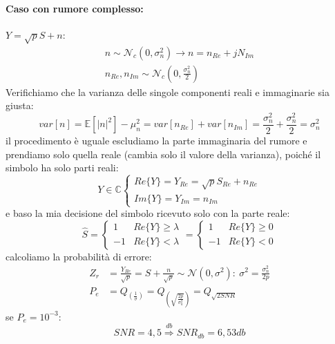             \paragraph{Caso con rumore complesso:} $Y = \sqrt{p}S + n$:
                \begin{gather}
                    n\sim \mathcal{N}_c(0,\sigma_n^2)\rightarrow n = n_{Re} + jN_{Im} \nonumber \\
                    n_{Re},n_{Im}\sim \mathcal{N}_c(0,\frac{\sigma_n^2}{2})\nonumber
                \end{gather}
                Verifichiamo che la varianza delle singole componenti reali e immaginarie sia giusta:
                \[
                    var[n] = \mathbb{E}[|n|^2]-\mu_n^2 = var[n_{Re}]+ var[n_{Im}] = \frac{\sigma_n^2}{2} + \frac{\sigma_n^2}{2} = \sigma_n^2
                \]
                il procedimento  è uguale escludiamo la parte immaginaria del rumore e prendiamo solo quella reale (cambia solo il valore della varianza),
                poiché il simbolo ha solo parti reali:
                \[
                    Y \in \mathbb{C} 
                    \begin{cases}
                        Re\{Y\} = Y_{Re} = \sqrt{p}S_{Re} + n_{Re}\nonumber \\
                        Im\{Y\} = Y_{Im} = n_{Im}\nonumber    
                    \end{cases}      
                \]      
                e baso la mia decisione del simbolo ricevuto solo con la parte reale:
                \[
                    \hat{S} = 
                    \begin{cases}
                        1 &Re\{Y\} \geq\lambda\nonumber \\    
                        -1 &Re\{Y\} <\lambda\nonumber    
                    \end{cases}  = 
                    \begin{cases}
                        1 &Re\{Y\} \geq0\nonumber \\    
                        -1 &Re\{Y\} <0\nonumber    
                    \end{cases}    
                \]
                calcoliamo la probabilità di errore:
                \begin{align}
                    Z_r &= \frac{Y_{Re}}{\sqrt{p}} = S+ \frac{n}{\sqrt{p}} \sim \mathcal{N}(0,\sigma^2):\ \sigma^2 = \frac{\sigma^2_n}{2p}\nonumber \\
                    P_e &= Q_{\displaystyle\left(\frac{1}{\sigma}\right)} = Q_{\displaystyle\left(\sqrt{\frac{2p}{\sigma_n^2}}\right)} = Q_{\sqrt{2SNR}}\nonumber
                \end{align}
                se $P_e = 10^{-3}$:
                \[
                    SNR = 4,5\overset{db}{\Rightarrow}{SNR}_{db}=6,53db    
                \]

